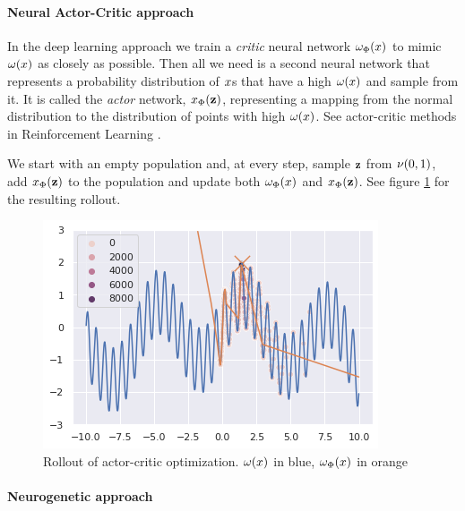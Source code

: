 \paragraph{Neural Actor-Critic approach}

In the deep learning approach we train a \emph{critic} neural network $ \omega_{\Phi}(x) $ to mimic $ \omega(x) $ as closely as possible. Then all we need is a second neural network that represents a probability distribution of $ x $s that have a high $ \omega(x) $ and sample from it. It is called the \emph{actor} network, $ x_{\Phi}(\mathbf{z}) $, representing a mapping from the normal distribution to the distribution of points with high $ \omega(x) $. See actor-critic methods in Reinforcement Learning \cite[section 13.5]{suttonReinforcementLearningSecond2018}.

We start with an empty population and, at every step, sample $ \mathbf{z} $ from $ \nu(0,1) $, add $ x_{\Phi}(\mathbf{z}) $ to the population and update both $ \omega_{\Phi}(x) $ and $ x_{\Phi}(\mathbf{z}) $. See figure \ref{fig:neuropt-actor-critic} for the resulting rollout.
    
\begin{figure}
    \centering
    \includegraphics[width=0.8\linewidth]{images/neuropt3.png}
    \caption{Rollout of actor-critic optimization. $ \omega(x) $ in blue, $ \omega_{\Phi}(x) $ in orange}
    \label{fig:neuropt-actor-critic}
\end{figure}


\paragraph{Neurogenetic approach}

